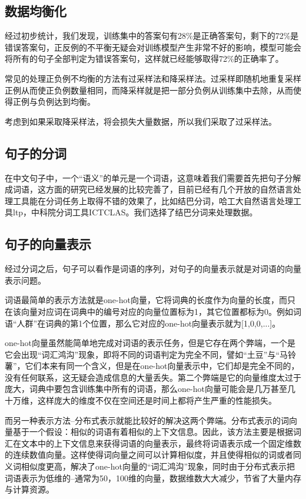\documentclass[UTF8]{ctexart}
\begin{document}
\subsection{数据均衡化}
经过初步统计，我们发现，训练集中的答案句有28\%是正确答案句，剩下的72\%是错误答案句，正反例的不平衡无疑会对训练模型产生非常不好的影响，模型可能会将所有的句子全部判定为错误答案句，这样就已经能够取得72\%的正确率了。

常见的处理正负例不均衡的方法有过采样法和降采样法。过采样即随机地重复采样正例从而使正负例数量相同，而降采样就是把一部分负例从训练集中去除，从而使得正例与负例达到均衡。

考虑到如果采取降采样法，将会损失大量数据，所以我们采取了过采样法。
\subsection{句子的分词}
在中文句子中，一个“语义”的单元是一个词语，这意味着我们需要首先把句子分解成词语，这方面的研究已经发展的比较完善了，目前已经有几个开放的自然语言处理工具能在分词任务上取得不错的效果了，比如结巴分词，哈工大自然语言处理工具ltp，中科院分词工具ICTCLAS。我们选择了结巴分词来处理数据。
\subsection{句子的向量表示}
经过分词之后，句子可以看作是词语的序列，对句子的向量表示就是对词语的向量表示问题。

词语最简单的表示方法就是one-hot向量，它将词典的长度作为向量的长度，而只在该向量对应词在词典中的编号对应的向量位置标为1，其它位置都标为0。例如词语“人群”在词典的第1个位置，那么它对应的one-hot向量表示就为[1,0,0,...]。

one-hot向量虽然能简单地完成对词语的表示任务，但是它存在两个弊端，一个是它会出现“词汇鸿沟”现象，即将不同的词语判定为完全不同，譬如“土豆”与“马铃薯”，它们本来有同一个含义，但是在one-hot向量表示中，它们却是完全不同的，没有任何联系，这无疑会造成信息的大量丢失。第二个弊端是它的向量维度太过于庞大，词典中要包含训练集中所有的词语，那么one-hot向量可能会是几万甚至几十万维，这样庞大的维度不仅在空间还是时间上都将产生严重的性能损失。

而另一种表示方法--分布式表示就能比较好的解决这两个弊端。分布式表示的词向量基于一个假设：相似的词语有着相似的上下文信息。因此，该方法主要是根据词汇在文本中的上下文信息来获得词语的向量表示，最终将词语表示成一个固定维数的连续数值向量。这样使得词向量之间可以计算相似度，并且使得相似的词或者同义词相似度更高，解决了one-hot向量的“词汇鸿沟”现象，同时由于分布式表示把词语表示为低维的--通常为50，100维的向量，数据维数大大减少，节省了大量内存与计算资源。
\end{document}
